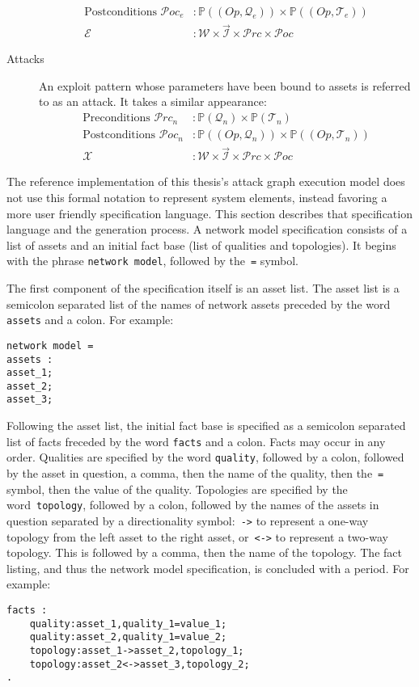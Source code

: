 \begin{description}
\begin{align*}
			\text{Postconditions } \mathcal{P}oc_e&: \mathbb{P}((Op,\mathcal{Q}_e)) \times \mathbb{P}((Op,\mathcal{T}_e)) \\
			\mathcal{E}&: \mathcal{W} \times \vec{\mathcal{I}} \times  \mathcal{P}rc \times \mathcal{P}oc
        \end{align*}
    \item[Attacks] An exploit pattern whose parameters have been bound to assets is referred to as an
		attack. It takes a similar appearance:
		\begin{align*}
			\text{Preconditions } \mathcal{P}rc_n &: \mathbb{P}(\mathcal{Q}_n) \times \mathbb{P}(\mathcal{T}_n) \\
			\text{Postconditions } \mathcal{P}oc_n&: \mathbb{P}((Op,\mathcal{Q}_n)) \times \mathbb{P}((Op,\mathcal{T}_n)) \\
			\mathcal{X}&: \mathcal{W} \times \vec{\mathcal{I}} \times  \mathcal{P}rc \times \mathcal{P}oc
        \end{align*}
\end{description}
The reference implementation of this thesis's attack graph execution model does not use this
formal notation to represent system elements, instead favoring a more user friendly specification
language. This section describes that specification language and the generation process. %
A network model specification consists of a list of assets and an initial fact base 
(list of qualities and topologies). It begins with the phrase \texttt{network model}, followed
by the~\texttt{=} symbol. 

The first component of the specification itself is an asset list.
The asset list is a semicolon separated list of the names of network
assets preceded by the word \texttt{assets} and a colon. For example:
\begin{lstlisting}
network model = 
assets :
asset_1;
asset_2;
asset_3;
\end{lstlisting}

Following the asset list, the initial
fact base is specified as a semicolon separated list of facts freceded by the word
\texttt{facts} and a colon. Facts may occur in any order. Qualities are specified by the
word \texttt{quality}, followed by a colon, followed by the asset in question, a comma,
then the name of the quality, then the~\texttt{=} symbol, then the value of the quality.
Topologies are specified by the word~\texttt{topology}, followed by a colon, followed by the names
of the assets in question separated by a directionality symbol:~\texttt{->} to represent a one-way
topology from the left asset to the right asset, or~\texttt{<->} to represent a two-way topology.
This is followed by a comma, then the name of the topology. The fact listing, and thus the
network model specification, is concluded with a period. For example:
\begin{lstlisting}
facts :
	quality:asset_1,quality_1=value_1;
	quality:asset_2,quality_1=value_2;
	topology:asset_1->asset_2,topology_1;
	topology:asset_2<->asset_3,topology_2;
.
\end{lstlisting}

